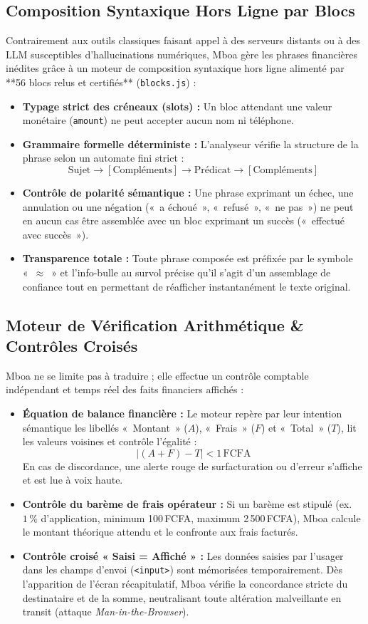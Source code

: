 \documentclass[10pt,a4paper]{article}
\begin{document}
\subsection{Composition Syntaxique Hors Ligne par Blocs}
Contrairement aux outils classiques faisant appel à des serveurs distants ou à des LLM susceptibles d'hallucinations numériques, Mboa gère les phrases financières inédites grâce à un moteur de composition syntaxique hors ligne alimenté par **56 blocs relus et certifiés** (\texttt{blocks.js}) :
\begin{itemize}
  \item \textbf{Typage strict des créneaux (slots) :} Un bloc attendant une valeur monétaire (\texttt{amount}) ne peut accepter aucun nom ni téléphone.
  \item \textbf{Grammaire formelle déterministe :} L'analyseur vérifie la structure de la phrase selon un automate fini strict :
  $$ \text{Sujet} \longrightarrow [\text{Compléments}] \longrightarrow \text{Prédicat} \longrightarrow [\text{Compléments}] $$
  \item \textbf{Contrôle de polarité sémantique :} Une phrase exprimant un échec, une annulation ou une négation («~a échoué~», «~refusé~», «~ne pas~») ne peut en aucun cas être assemblée avec un bloc exprimant un succès («~effectué avec succès~»).
  \item \textbf{Transparence totale :} Toute phrase composée est préfixée par le symbole «~$\approx$~» et l'info-bulle au survol précise qu'il s'agit d'un assemblage de confiance tout en permettant de réafficher instantanément le texte original.
\end{itemize}

\subsection{Moteur de Vérification Arithmétique \& Contrôles Croisés}
Mboa ne se limite pas à traduire ; elle effectue un contrôle comptable indépendant et temps réel des faits financiers affichés :
\begin{itemize}
  \item \textbf{Équation de balance financière :} Le moteur repère par leur intention sémantique les libellés «~Montant~» ($A$), «~Frais~» ($F$) et «~Total~» ($T$), lit les valeurs voisines et contrôle l'égalité :
  $$ |(A + F) - T| < 1\,\text{FCFA} $$
  En cas de discordance, une alerte rouge de surfacturation ou d'erreur s'affiche et est lue à voix haute.
  \item \textbf{Contrôle du barème de frais opérateur :} Si un barème est stipulé (ex. $1\,\%$ d'application, minimum 100\,FCFA, maximum 2\,500\,FCFA), Mboa calcule le montant théorique attendu et le confronte aux frais facturés.
  \item \textbf{Contrôle croisé « Saisi = Affiché » :} Les données saisies par l'usager dans les champs d'envoi (\texttt{<input>}) sont mémorisées temporairement. Dès l'apparition de l'écran récapitulatif, Mboa vérifie la concordance stricte du destinataire et de la somme, neutralisant toute altération malveillante en transit (attaque \textit{Man-in-the-Browser}).
\end{itemize}
\end{document}

